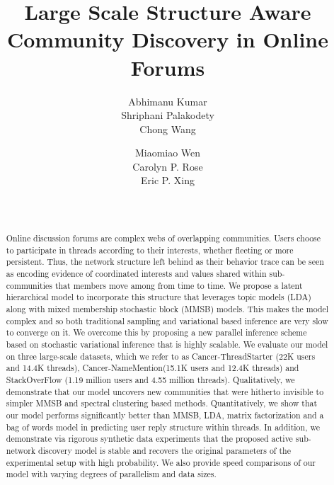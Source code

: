 \documentclass{sig-alternate}
\title{Large Scale Structure Aware Community Discovery in Online Forums}
\author{
\alignauthor
Abhimanu Kumar \\
\email{abhimank@cs.cmu.edu}
\alignauthor
Shriphani Palakodety \\
\email{shriphanip@gmail.com}
\alignauthor
Chong Wang \\
\email{chongw@cs.cmu.edu}
\and
\alignauthor
Miaomiao Wen\\
\email{mwen@cs.cmu.edu}
\alignauthor
Carolyn P. Rose\\
\email{cprose@cs.cmu.edu}
\alignauthor
Eric P. Xing\\
\email{epxing@cs.cmu.edu}
\sharedaffiliation
\affaddr{School of Computer Science}  \\
\affaddr{Carnegie Mellon University}  \\
}
\begin{document}
\maketitle
\begin{abstract}
Online discussion forums are complex webs of overlapping communities. 
Users choose to participate in threads according to their interests, 
whether fleeting or more persistent. Thus, the network structure left 
behind as their behavior trace can be seen as encoding evidence of 
coordinated interests and values shared within sub-communities that 
members move among from time to time.  We propose a latent 
hierarchical model to incorporate this structure that leverages topic 
models (LDA) along with mixed membership stochastic block (MMSB) 
models. This makes the model complex and so both traditional sampling and 
variational based inference are very slow to converge on it. We overcome 
this by proposing a new parallel inference scheme based on stochastic 
variational inference that is highly scalable. We evaluate our 
model on three large-scale datasets, which we refer to as 
Cancer-ThreadStarter (22K users and 14.4K threads), Cancer-NameMention(15.1K 
users and 12.4K threads) and StackOverFlow (1.19 million users and 
4.55 million threads). Qualitatively, we demonstrate that our 
model uncovers new communities that were hitherto invisible to  
simpler MMSB and spectral clustering based methods. Quantitatively, we 
show that our model performs significantly better than MMSB, LDA, 
matrix factorization and a bag of words model in predicting 
user reply structure within threads. In addition, we demonstrate 
via rigorous synthetic data experiments that the proposed active sub-network 
discovery model is stable and recovers the original parameters of 
the experimental setup with high probability. We also provide speed 
comparisons of our model with varying degrees of 
parallelism and data sizes.  

\end{abstract}


\end{document}
